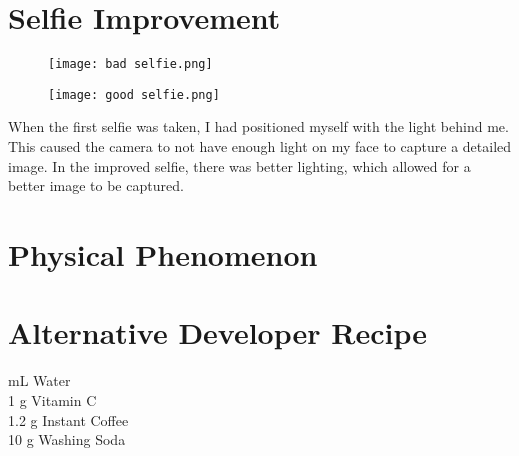 \documentclass[12pt]{article}
\begin{document}

\newpage
\section*{Selfie Improvement}
    \begin{figure}
    \centering
    \begin{minipage}{.5\textwidth}
      \centering
      \texttt{[image: bad selfie.png]}
      \label{fig:test1}
    \end{minipage}%
    \begin{minipage}{.5\textwidth}
      \centering
      \texttt{[image: good selfie.png]}
      \label{fig:test2}
    \end{minipage}
    \end{figure}
    When the first selfie was taken, I had positioned myself with the light behind me. This caused the camera to not have enough light on my face to capture a detailed image. In the improved selfie, there was better lighting, which allowed for a better image to be captured.
\section*{Physical Phenomenon}
\section*{Alternative Developer Recipe}
 mL Water\\
1 g Vitamin C\\
1.2 g Instant Coffee\\
10 g Washing Soda\\
\end{document}
